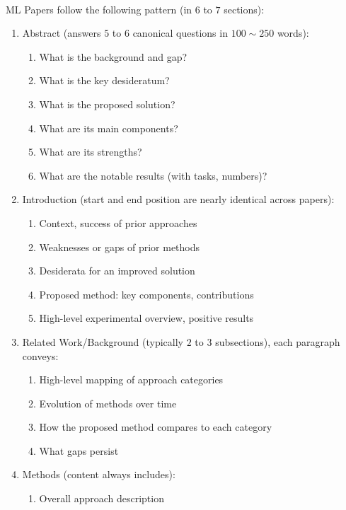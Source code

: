 \begin{remark} \\
ML Papers follow the following pattern (in $6$ to $7$ sections):
\begin{enumerate}[label=\roman*.]
\setlength{\itemsep}{0pt}
\item Abstract (answers $5$ to $6$ canonical questions in $100 \sim 250$ words):
\begin{enumerate}[label=\arabic*.]
\setlength{\itemsep}{0pt}
\item What is the background and gap?
\item What is the key desideratum?
\item What is the proposed solution?
\item What are its main components?
\item What are its strengths?
\item What are the notable results (with tasks, numbers)?
\end{enumerate}
\item Introduction (start and end position are nearly identical across papers):
\begin{enumerate}[label=\arabic*.]
\setlength{\itemsep}{0pt}
\item Context, success of prior approaches
\item Weaknesses or gaps of prior methods
\item Desiderata for an improved solution
\item Proposed method: key components, contributions
\item High-level experimental overview, positive results
\end{enumerate}
\item Related Work/Background (typically $2$ to $3$ subsections), each paragraph conveys:
\begin{enumerate}[label=\arabic*.]
\setlength{\itemsep}{0pt}
\item High-level mapping of approach categories
\item Evolution of methods over time
\item How the proposed method compares to each category
\item What gaps persist
\end{enumerate}
\item Methods (content always includes):
\begin{enumerate}[label=\arabic*.]
\setlength{\itemsep}{0pt}
\item Overall approach description

\end{enumerate}
\end{enumerate}
\end{remark}
